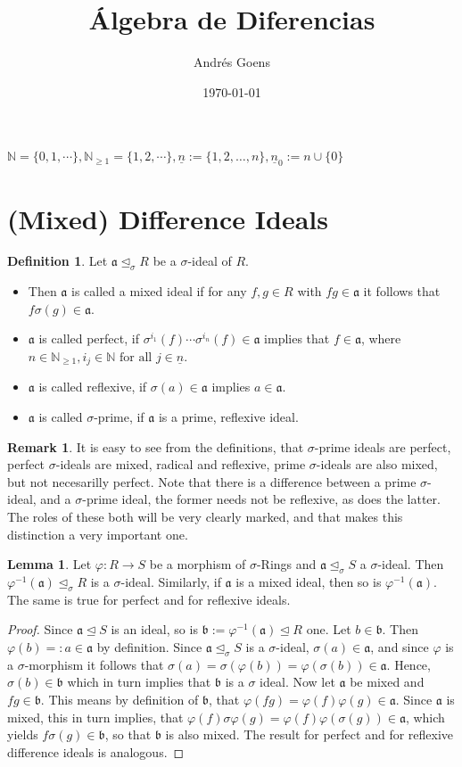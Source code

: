 \documentclass[12pt,a4paper,BCOR15mm,twoside,DIV12]{article}
\title{Álgebra de Diferencias}
\author{Andr\'{e}s Goens}
\date{\today}
\def\NE{\mathbb{N}_{\geq1}}
\def\N{\mathbb{N}}
\def\a{\mathfrak{a}}
\def\b{\mathfrak{b}}
\def\s{\sigma}
\def\si{\unlhd_{\sigma}}
\def\n{\underline{n}}
\def\fa{\text{ for all }}
\newenvironment{bew}{\begin{proof}[Proof]}{\end{proof}}
\theoremstyle{definition}
\newtheorem{rem}[Satz]{Remark}
\newtheorem{defn}[Satz]{Definition}
\newtheorem{lem}[Satz]{Lemma}
\begin{document}
$\N = \{0,1,\cdots \}, \NE = \{1,2,\cdots \}, \n := \{1,2,\ldots, n\}, \n_0 := n \cup \{0\}$
\section{(Mixed) Difference Ideals}
\begin{defn}
Let  $\a \si R$ be a $\s$-ideal of $R$. 
\begin{itemize}
\item Then $\a$ is called a mixed ideal if for any $f,g \in R$ with $fg \in \a$ it follows that $f \sigma(g) \in \a$.
\item $\a$ is called perfect, if $\sigma^{i_1}(f) \cdots \sigma^{i_n}(f) \in \a$ implies that $f \in \a$, where $n \in \NE, i_j \in \N \fa j \in \n$.
\item $\a$ is called reflexive, if $\s(a) \in \a$ implies $a \in \a$.
\item $\a$ is called $\s$-prime, if $\a$ is a prime, reflexive ideal.
\end{itemize}
\end{defn}

\begin{rem}
It is easy to see from the definitions, that $\s$-prime ideals are perfect, perfect $\s$-ideals are mixed, radical and reflexive, prime $\s$-ideals are also mixed, but not necesarilly perfect. Note that there is a difference between a prime $\s$-ideal, and a $\s$-prime ideal, 
the former needs not be reflexive, as does the latter. The roles of these both will be very clearly marked, and that makes this distinction a very important one.
\end{rem}

\begin{lem}\label{bijmapping}
Let $\varphi: R \rightarrow S$ be a morphism of $\s$-Rings and $\a \si S$ a $\s$-ideal. Then $\varphi^{-1}(\a) \si R$ is a $\s$-ideal. Similarly, if $\a$ is a mixed ideal, then so is $\varphi^{-1}(\a)$. The same is true for perfect and for reflexive ideals.
\begin{bew}
Since $\a \unlhd S$ is an ideal, so is $\b := \varphi^{-1}(\a) \unlhd R$ one. Let $b \in \b$. Then $\varphi(b) =: a \in \a$ by definition. Since $\a \si S$ is a $\s$-ideal, $\s(a) \in \a$, and since $\varphi$ is a $\s$-morphism
 it follows that $\sigma(a) = \sigma(\varphi(b)) = \varphi (\s (b)) \in \a$. Hence, $\s(b) \in \b$ which in turn implies that $\b$ is a $\s$ ideal. Now let $\a$ be mixed and $fg \in \b$. This means by definition of $\b$, 
that $\varphi(fg) = \varphi(f) \varphi(g) \in \a$. Since $\a$ is mixed, this in turn implies, that $\varphi(f) \s \varphi(g) = \varphi(f) \varphi(\s(g)) \in \a$, which yields $f\s(g) \in \b$, so that $\b$ is also mixed. 
The result for perfect and for reflexive difference ideals is analogous.
\end{bew}
\end{lem}
\end{document}
